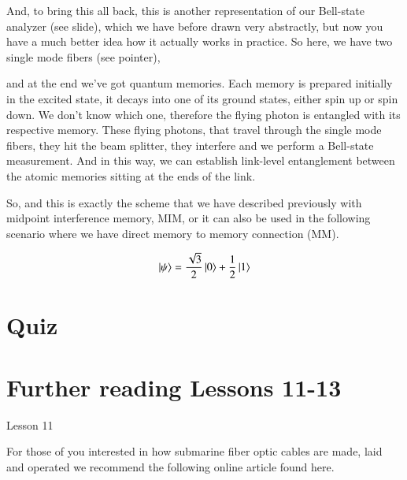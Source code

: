 And, to bring this all back, this is another representation of our Bell-state analyzer (see slide), which we have before drawn very abstractly, but now you have a much better idea how it actually works in practice. So here, we have two single mode fibers (see pointer),

and at the end we've got quantum memories. Each memory is prepared initially in the excited state, it decays into one of its ground states, either spin up or spin down. We don't know which one, therefore the flying photon is entangled with its respective memory. These flying photons, that travel through the single mode fibers, they hit the beam splitter, they interfere and we perform a Bell-state measurement. And in this way, we can establish link-level entanglement between the atomic memories sitting at the ends of the link.

So, and this is exactly the scheme that we have described previously with midpoint interference memory, MIM, or it can also be used in the following scenario where we have direct memory to memory connection (MM).



\newpage
\begin{exercises}
\begin{equation*}
\left| \psi \right\rangle = \frac{\sqrt{3}}{2}\left| 0 \right\rangle + \frac{1}{2}\left| 1 \right\rangle
\end{equation*}


\end{exercises}

\newpage
\section*{Quiz}


\section*{Further reading Lessons 11-13}

Lesson 11

For those of you interested in how submarine fiber optic cables are made, laid and operated we recommend the following online article found here.


